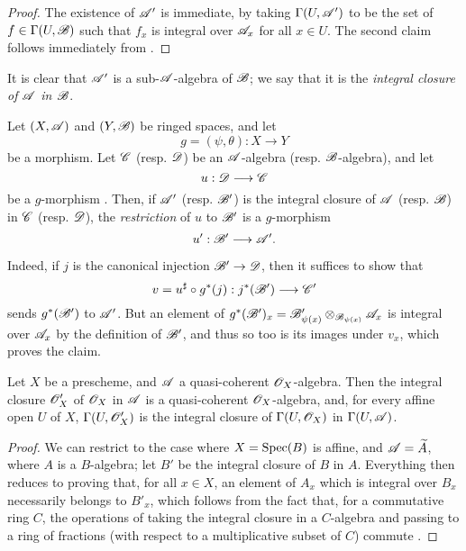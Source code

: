\begin{proof}
The existence of $\mathscr{A}'$ is immediate, by taking $\Gamma(U,\mathscr{A}')$ to be the set of $f\in\Gamma(U,\mathscr{B})$ such that $f_x$ is integral over $\mathscr{A}_x$ for all $x\in U$.
The second claim follows immediately from .
\end{proof}

It is clear that $\mathscr{A}'$ is a sub-$\mathscr{A}$-algebra of $\mathscr{B}$;
we say that it is the \emph{integral closure of $\mathscr{A}$ in $\mathscr{B}$}.

\begin{env}[6.3.3]
\label{II.6.3.3}
Let $(X,\mathscr{A})$ and $(Y,\mathscr{B})$ be ringed spaces, and let
\[
  g = (\psi,\theta):X\to Y
\]
be a morphism.
Let $\mathscr{C}$ (resp. $\mathscr{D}$) be an $\mathscr{A}$-algebra (resp. $\mathscr{B}$-algebra), and let
\[
  u:\sh{D}\to\sh{C}
\]
be a $g$-morphism .
Then, if $\mathscr{A}'$ (resp. $\mathscr{B}'$) is the integral closure of $\mathscr{A}$ (resp. $\mathscr{B}$) in $\mathscr{C}$ (resp. $\mathscr{D}$), the \emph{restriction} of $u$ to $\mathscr{B}'$ is a $g$-morphism
\[
  u':\sh{B}'\to\sh{A}'.
\]

Indeed, if $j$ is the canonical injection $\sh{B}'\to\sh{D}$, then it suffices to show that
\[
  v = u^\sharp\circ g^*(j) : j^*(\sh{B}')\to\sh{C}'
\]
sends $g^*(\mathscr{B}')$ to $\mathscr{A}'$.
But an element of $g^*(\mathscr{B}')_x=\mathscr{B}'_{\psi(x)}\otimes_{\mathscr{B}_{\psi(x)}}\mathscr{A}_x$ is integral over $\mathscr{A}_x$ by the definition of $\mathscr{B}'$, and thus so too is its images under $v_x$, which proves the claim.
\end{env}

\begin{proposition}[6.3.4]
\label{II.6.3.4}
Let $X$ be a prescheme, and $\mathscr{A}$ a quasi-coherent $\mathscr{O}_X$-algebra.
Then the integral closure $\mathscr{O}'_X$ of $\mathscr{O}_X$ in $\mathscr{A}$ is a quasi-coherent $\mathscr{O}_X$-algebra, and, for every affine open $U$ of $X$, $\Gamma(U,\mathscr{O}'_X)$ is the integral closure of $\Gamma(U,\mathscr{O}_X)$ in $\Gamma(U,\mathscr{A})$.
\end{proposition}

\begin{proof}
We can restrict to the case where $X=\operatorname{Spec}(B)$ is affine, and $\mathscr{A}=\widetilde{A}$, where $A$ is a $B$-algebra;
let $B'$ be the integral closure of $B$ in $A$.
Everything then reduces to proving that, for all $x\in X$, an element of $A_x$ which is integral over $B_x$ necessarily belongs to $B'_x$, which follows from the fact that, for a commutative ring $C$, the operations of taking the integral closure in a $C$-algebra and passing to a ring of fractions (with respect to a multiplicative subset of $C$) commute \cite[t.~I, pp.~261 and 257]{I-13}.
\end{proof}

